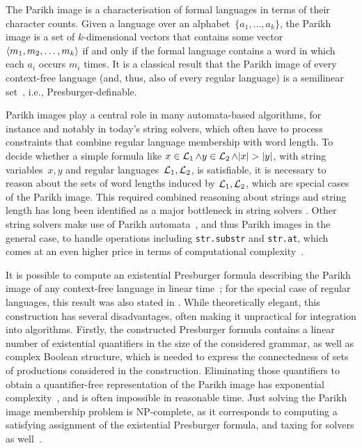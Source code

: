 The Parikh image is a characterisation of formal languages in terms of
their character counts. Given a language over an
alphabet~$\{a_1, \ldots, a_k\}$, the Parikh image is a set of
$k$-dimensional vectors that contains some
vector~$\left\langle m_1, m_2, \ldots, m_k\right\rangle$ if and only if the
formal language contains a word in which each $a_i$ occurs $m_i$
times. It is a classical result that the Parikh image of every
context-free language (and, thus, also of every regular language) is a
semilinear set~\cite{parikh-theorem}, i.e., Presburger-definable.

Parikh images play a central role in many automata-based algorithms,
for instance and notably in today's string solvers, which often have
to process constraints that combine regular language membership with
word length. To decide whether a simple formula like
$x \in \operatorname{\mathcal{L}}_1 \wedge y \in \operatorname{\mathcal{L}}_2 \wedge |x| > |y|$,
with string variables~$x, y$ and regular
languages~$\operatorname{\mathcal{L}}_1, \operatorname{\mathcal{L}}_2$, is satisfiable, it is
necessary to reason about the sets of word lengths induced by
$\operatorname{\mathcal{L}}_1, \operatorname{\mathcal{L}}_2$, which are special cases of the Parikh
image.  This required combined reasoning about strings and string
length has long been identified as a major bottleneck in string
solvers
\cite{DBLP:conf/cav/AbdullaACHRRS15,length-aware-solver,approximate-parikh,DBLP:journals/corr/BerzishZG17}.
Other string solvers make use of Parikh automata~\cite{parikh-automata}, and thus
Parikh images in the general case, to handle operations including
\verb!str.substr!  and \verb!str.at!, which comes at an even higher
price in terms of computational complexity~\cite{ostrich-plus}.


It is possible to compute an existential Presburger formula describing
the Parikh image of any context-free language in linear
time~\cite{generate-parikh-image}; for the special case of regular
languages, this result was also stated in
\cite{muscholl-linear}. While theoretically elegant, this construction
has several disadvantages, often making it unpractical for integration
into algorithms. Firstly, the constructed Presburger formula contains
a linear number of existential quantifiers in the size of the
considered grammar, as well as complex Boolean structure, which is
needed to express the connectedness of sets of productions considered
in the construction. Eliminating those quantifiers to obtain a
quantifier-free representation of the Parikh image has exponential
complexity~\cite{DBLP:conf/issac/Weispfenning97}, and is often impossible in reasonable
time. Just solving the Parikh image membership problem is NP-complete,
as it corresponds to computing a satisfying assignment of the
existential Presburger formula, and taxing for solvers as
well~\cite{ostrich-plus}.

